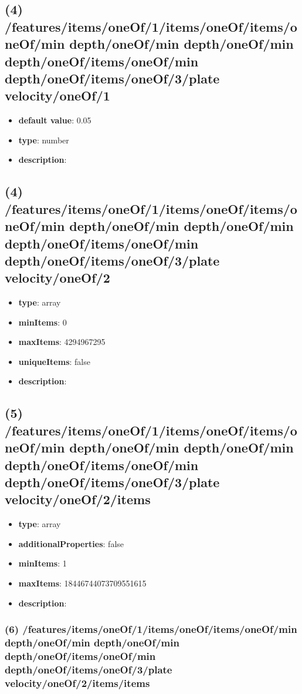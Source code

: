 \subsection{(4) /features/items/oneOf/1/items/oneOf/items/oneOf/min depth/oneOf/min depth/oneOf/min depth/oneOf/items/oneOf/min depth/oneOf/items/oneOf/3/plate velocity/oneOf/1}
\begin{itemize}[leftmargin=4em]\item {\bf default value}: 0.05
\item {\bf type}: number
\item {\bf description}: 
\end{itemize}\subsection{(4) /features/items/oneOf/1/items/oneOf/items/oneOf/min depth/oneOf/min depth/oneOf/min depth/oneOf/items/oneOf/min depth/oneOf/items/oneOf/3/plate velocity/oneOf/2}
\begin{itemize}[leftmargin=4em]\item {\bf type}: array
\item {\bf minItems}: 0
\item {\bf maxItems}: 4294967295
\item {\bf uniqueItems}: false
\item {\bf description}: 
\end{itemize}\subsection{(5) /features/items/oneOf/1/items/oneOf/items/oneOf/min depth/oneOf/min depth/oneOf/min depth/oneOf/items/oneOf/min depth/oneOf/items/oneOf/3/plate velocity/oneOf/2/items}
\begin{itemize}[leftmargin=5em]\item {\bf type}: array
\item {\bf additionalProperties}: false
\item {\bf minItems}: 1
\item {\bf maxItems}: 18446744073709551615
\item {\bf description}: 
\end{itemize}\subsubsection{(6) /features/items/oneOf/1/items/oneOf/items/oneOf/min depth/oneOf/min depth/oneOf/min depth/oneOf/items/oneOf/min depth/oneOf/items/oneOf/3/plate velocity/oneOf/2/items/items}
